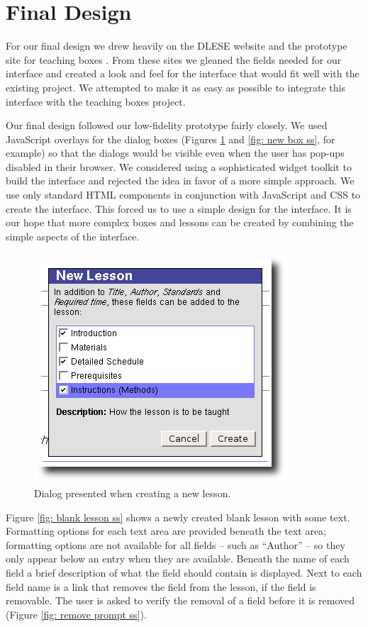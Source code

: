 \documentclass[10pt,letter]{article}
\begin{document}
\section{Final Design}
For our final design we drew heavily on the DLESE website \cite{bib:preview} and
the prototype site for teaching boxes \cite{bib:teachingboxes.org}. From these
sites we gleaned the fields needed for our interface and created a look and feel
for the interface that would fit well with the existing project. We attempted to
make it as easy as possible to integrate this interface with the teaching boxes
project.

Our final design followed our low-fidelity prototype fairly closely. We used
JavaScript overlays for the dialog boxes (Figures \ref{fig: new lesson ss} and
\ref{fig: new box ss}, for example) so that the dialogs would be visible even
when the user has pop-ups disabled in their browser. We considered using a
sophisticated widget toolkit to build the interface and rejected the idea in
favor of a more simple approach. We use only standard HTML components in
conjunction with JavaScript and CSS to create the interface. This forced us to
use a simple design for the interface. It is our hope that more complex boxes
and lessons can be created by combining the simple aspects of the interface.

\begin{figure}
	\centering
	\includegraphics[width=0.45\linewidth]{figures/new_lesson}
	\caption{Dialog presented when creating a new lesson.}
	\label{fig: new lesson ss}
\end{figure}

Figure \ref{fig: blank lesson ss} shows a newly created blank lesson with some
text. Formatting options for each text area are provided beneath the text area;
formatting options are not available for all fields -- such as ``Author'' -- so
they only appear below an entry when they are available. Beneath the name of
each field a brief description of what the field should contain is displayed.
Next to each field name is a link that removes the field from the lesson, if the
field is removable. The user is asked to verify the removal of a field before it
is removed (Figure \ref{fig: remove prompt ss}).
\end{document}
